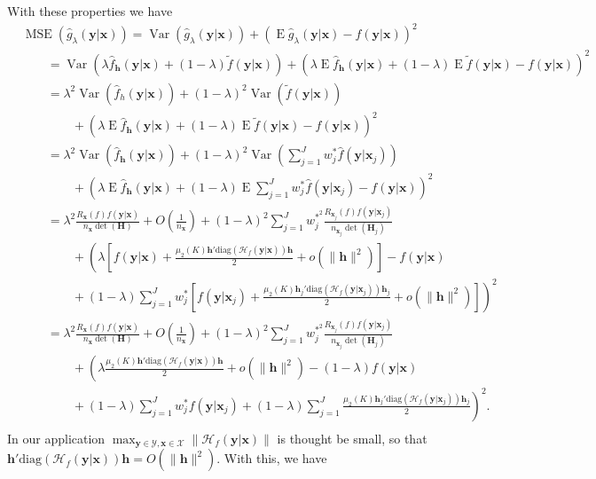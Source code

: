 \documentclass[11pt]{article}
\newcommand{\Y}{\mathcal{Y}}
\newcommand{\X}{\mathcal{X}}
\newcommand{\Hcal}{\mathcal{H}}
\newcommand{\Hbf}{\textbf{H}}
\newcommand{\y}{\textbf{y}}
\newcommand{\x}{\textbf{x}}
\newcommand{\h}{\textbf{h}}
\newcommand{\wstar}{w^{\textstyle{*}}}
\newcommand{\wstarsq}{w^{\textstyle{*}^2}}
\DeclareMathOperator{\E}{E}
\DeclareMathOperator{\Var}{Var}
\DeclareMathOperator{\MSE}{MSE}
\begin{document}
With these properties we have
\begin{align*}
  &\MSE(\hat g_\lambda(\y|\x)) 
    = \Var\left(\hat g_\lambda(\y|\x)\right) 
    + \left(\E\hat g_\lambda(\y|\x) - f(\y|\x)\right)^2 \\
  &\qquad= \Var\left(\lambda \hat f_\h(\y|\x) + (1 - \lambda)\tilde{f}(\y|\x)\right) 
    + \left(\lambda\E\hat f_\h(\y|\x) 
    + (1 - \lambda)\E\tilde{f}(\y|\x) - f(\y|\x)\right)^2 \\
  &\qquad= \lambda^2\Var\left(\hat f_h(\y|\x)\right) 
    + (1 - \lambda)^2\Var\left(\tilde{f}(\y|\x)\right) \\
      &\qquad\qquad+ \left(\lambda\E\hat f_\h(\y|\x) 
      +  (1 - \lambda)\E\tilde{f}(\y|\x) 
      - f(\y|\x)\right)^2 \\ 
  &\qquad= \lambda^2\Var\left(\hat f_\h(\y|\x)\right) 
    + (1 - \lambda)^2\Var\left(\sum_{j=1}^J\wstar_j\hat f(\y|\x_j)\right) \\
      &\qquad\qquad+ \left(\lambda\E\hat f_\h(\y|\x) 
      + (1 - \lambda)\E\sum_{j=1}^J\wstar_j\hat f(\y|\x_j) 
      - f(\y|\x)\right)^2 \\ 
  &\qquad= \lambda^2 \frac{R_{\x}(f)f(\y|\x)}{n_\x\det(\Hbf)} + O\left(\frac{1}{n_\x}\right)
    + (1 - \lambda)^2\sum_{j=1}^J\wstarsq_j\frac{R_{\x_j}(f)f(\y|\x_j)}{n_{\x_j}\det(\Hbf_j)} \\
    &\qquad\qquad+ \left(\lambda\left[f(\y|\x) + \frac{\mu_2(K)\h'\text{diag}(\Hcal_f(\y|\x))\h}{2} 
    + o(\|\h\|^2)\right] - f(\y|\x) \right. \\
	&\qquad\qquad+ \left. 
	(1 - \lambda)\sum_{j=1}^J\wstar_j\left[f(\y|\x_j) + 
	\frac{\mu_2(K)\h_j'\text{diag}(\Hcal_f(\y|\x_j))\h_j}{2} 
    + o(\|\h\|^2)\right]\right)^2 \\
  &\qquad= \lambda^2 \frac{R_{\x}(f)f(\y|\x)}{n_\x\det(\Hbf)} + O\left(\frac{1}{n_\x}\right)
    + (1 - \lambda)^2\sum_{j=1}^J\wstarsq_j\frac{R_{\x_j}(f)f(\y|\x_j)}{n_{\x_j}\det(\Hbf_j)} \\
    &\qquad\qquad+ \left(\lambda\frac{\mu_2(K)\h'\text{diag}(\Hcal_f(\y|\x))\h}{2} 
    + o(\|\h\|^2) - (1-\lambda)f(\y|\x) \right. \\
	&\qquad\qquad+ \left. 
	(1 - \lambda)\sum_{j=1}^J\wstar_jf(\y|\x_j) + 
	(1 - \lambda)\sum_{j=1}^J\frac{\mu_2(K)\h_j'\text{diag}(\Hcal_f(\y|\x_j))\h_j}{2}\right)^2. \\    
\end{align*}
In our application $\max_{\y \in \Y, \x \in \X}\|\Hcal_f(\y|\x)\|$ is thought be small, so that $\h'\text{diag}(\Hcal_f(\y|\x))\h = O(\|\h\|^2)$. With this, we have
\end{document}
